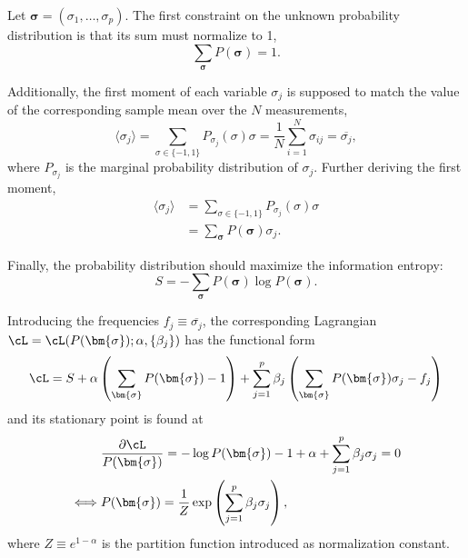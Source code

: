 \documentclass[12pt]{article}
\begin{document}
  Let $\bm{\sigma} = (\sigma_1, \dots, \sigma_p)$. The first constraint on the
  unknown probability distribution is that its sum must normalize to 1,
  \begin{equation}
    \sum_{\bm{\sigma}} P(\bm{\sigma}) = 1.
  \end{equation}

  Additionally, the first moment of each variable $\sigma_j$ is supposed to
  match the value of the corresponding sample mean over the $N$ measurements,
  \begin{equation}
    \langle \sigma_j \rangle = \sum_{\sigma\in\{-1, 1\}} P_{\sigma_j}(\sigma)
      \sigma = \frac{1}{N} \sum_{i = 1}^N \sigma_{ij} = \overline{\sigma_j},
  \end{equation}
  where $P_{\sigma_j}$ is the marginal probability distribution of $\sigma_j$.
  Further deriving the first moment,
  \begin{equation}
    \begin{split}
      \langle \sigma_j \rangle &= \sum_{\sigma\in\{-1, 1\}}
        P_{\sigma_j}(\sigma) \sigma\\
      &= \sum_{\bm{\sigma}} P(\bm{\sigma}) \sigma_j.
    \end{split}
  \end{equation}

  Finally, the probability distribution should maximize the information entropy:
  \begin{equation}
    S = -\sum_{\bm{\sigma}} P(\bm{\sigma}) \log P(\bm{\sigma}).
  \end{equation}

  Introducing the frequencies $f_j\equiv \overline{\sigma_j}$, the
  corresponding Lagrangian $\cL = \cL(P(\bm{\sigma}); \alpha,
  \{\beta_j\})$ has the functional form
  \begin{equation}
    \cL = S + \alpha\left(\sum_{\bm{\sigma}} P(\bm{\sigma}) -
      1\right) + \sum_{j = 1}^p \beta_j \left(\sum_{\bm{\sigma}}
      P(\bm{\sigma})\sigma_j - f_j\right)
  \end{equation}
  and its stationary point is found at
  \begin{equation}
    \begin{split}
      &\frac{\partial \cL}{P(\bm{\sigma})} = -\log P(\bm{\sigma}) - 1
        + \alpha + \sum_{j = 1}^p \beta_j \sigma_j = 0\\
      \iff& P(\bm{\sigma}) = \frac{1}{Z}\exp\left(\sum_{j = 1}^p \beta_j
        \sigma_j\right),
    \end{split}
  \end{equation}
  where $Z \equiv e^{1 - \alpha}$ is the partition function introduced as
  normalization constant.
\end{document}
